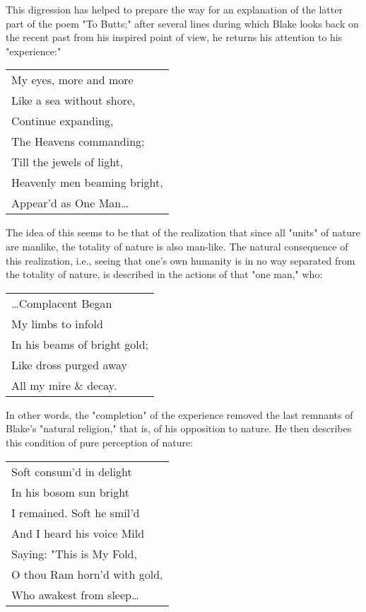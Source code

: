 This digression has helped to prepare the way for an explanation of the latter
part of the poem "To Butts;" after several lines during which Blake looks back on the 
recent past from his inspired point of view, he returns his attention to his "experience:"\par
\begin{center}
	\parbox{0.8\textwidth}{
		\centering
		\begin{tabular}{l}
			My eyes, more and more       \\
			Like a sea without shore,    \\
			Continue expanding,          \\
			The Heavens commanding;      \\
			Till the jewels of light,    \\
			Heavenly men beaming bright, \\
			Appear'd as One Man\dots
		\end{tabular}
	}%
\end{center}
\hspace*{5mm}The idea of this seems to be that of the realization that since all "units" of nature
are manlike, the totality of nature is also man-like. The natural consequence of this
realization, i.e., seeing that one's own humanity is in no way separated from the totality
of nature, is described in the actions of that "one man," who:\par
\begin{center}
	\parbox{0.8\textwidth}{
		\centering
		\begin{tabular}{l}
			\dots Complacent Began       \\
			My limbs to infold           \\
			In his beams of bright gold; \\
			Like dross purged away       \\
			All my mire \& decay.
		\end{tabular}
	}%
\end{center}
\hspace*{5mm}In other words, the "completion" of the experience removed the last remnants of Blake's
"natural religion," that is, of his opposition to nature. He then describes this condition of 
pure perception of nature:\par
\begin{center}
	\parbox{0.8\textwidth}{
		\centering
		\begin{tabular}{l}
			Soft consum'd in delight     \\
			In his bosom sun bright      \\
			I remained. Soft he smil'd   \\
			And I heard his voice Mild   \\
			Saying: "This is My Fold,    \\
			O thou Ram horn'd with gold, \\
			Who awakest from sleep\dots
		\end{tabular}
	}%
\end{center}
